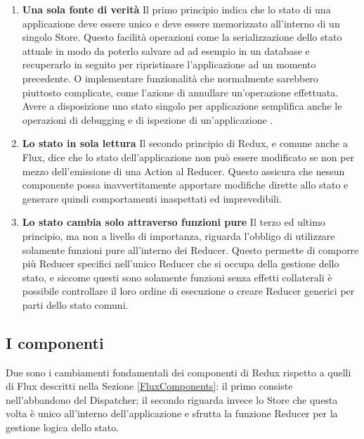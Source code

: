 \begin{enumerate}
    \item \textbf{Una sola fonte di verità} Il primo principio indica che lo stato di una applicazione deve essere unico e deve essere memorizzato all'interno di un singolo Store.
    Questo facilità operazioni come la serializzazione dello stato attuale in modo da poterlo salvare ad ad esempio in un database e recuperarlo in seguito per ripristinare l'applicazione ad un momento precedente. O implementare funzionalità che normalmente sarebbero piuttosto complicate, come l'azione di annullare un'operazione effettuata.
    Avere a disposizione uno stato singolo per applicazione semplifica anche le operazioni di debugging e di ispezione di un'applicazione \cite{ReduxThreePrinciples}.

    \item \textbf{Lo stato in sola lettura} Il secondo principio di Redux, e comune anche a Flux, dice che lo stato dell'applicazione non può essere modificato se non per mezzo dell'emissione di una Action al Reducer. Questo assicura che nessun componente possa inavvertitamente apportare modifiche dirette allo stato e generare quindi comportamenti inaspettati ed imprevedibili.

    \item \textbf{Lo stato cambia solo attraverso funzioni pure} Il terzo ed ultimo principio, ma non a livello di importanza, riguarda l'obbligo di utilizzare solamente funzioni pure all'interno dei Reducer. Questo permette di comporre più Reducer specifici nell'unico Reducer che si occupa della gestione dello stato, e siccome questi sono solamente funzioni senza effetti collaterali è possibile controllare il loro ordine di esecuzione o creare Reducer generici per parti dello stato comuni.
\end{enumerate}

\subsection{I componenti}
Due sono i cambiamenti fondamentali dei componenti di Redux rispetto a quelli di Flux descritti nella Sezione \ref{FluxComponents}: il primo consiste nell'abbandono del Dispatcher; il secondo riguarda invece lo Store che questa volta è unico all'interno dell'applicazione e sfrutta la funzione Reducer per la gestione logica dello stato.

